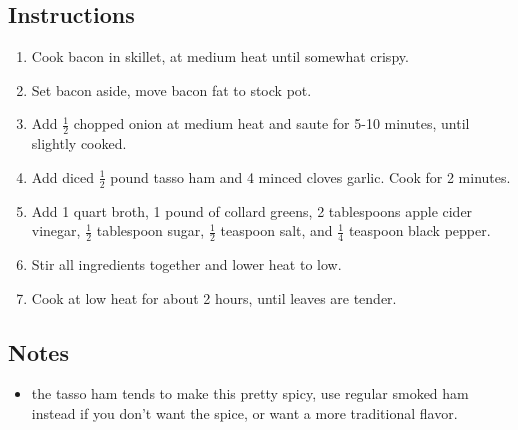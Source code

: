 \begin{multicols}{2}
\subsection*{Instructions}
\begin{enumerate}
    \item Cook bacon in skillet, at medium heat until somewhat crispy.
    \item Set bacon aside, move bacon fat to stock pot.
    \item Add \( \frac{1}{2} \) chopped onion at medium heat and saute for 5-10 minutes, until slightly cooked.
    \item Add diced \( \frac{1}{2} \) pound tasso ham and 4 minced cloves garlic. Cook for 2 minutes.
    \item Add 1 quart broth, 1 pound of collard greens, 2 tablespoons apple cider vinegar, \( \frac{1}{2} \) tablespoon sugar, \( \frac{1}{2} \) teaspoon salt, and \( \frac{1}{4} \) teaspoon black pepper.
    \item Stir all ingredients together and lower heat to low.
    \item Cook at low heat for about 2 hours, until leaves are tender.
\end{enumerate}

\subsection*{Notes}
\begin{itemize}
    \item the tasso ham tends to make this pretty spicy, use regular smoked ham instead if you don't want the spice, or want a more traditional flavor.
\end{itemize}
\end{multicols}
\clearpage